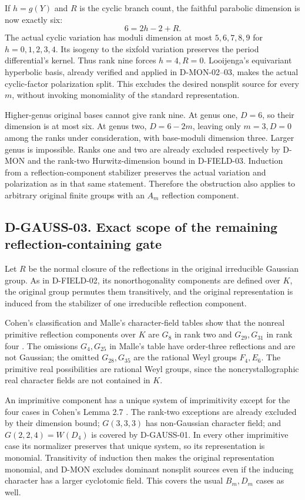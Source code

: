 If \(h=g(Y)\) and \(R\) is the cyclic branch count, the faithful
parabolic dimension is now exactly six:
\[
                              6=2h-2+R.
\]
The actual cyclic variation has moduli dimension at most
\(5,6,7,8,9\) for \(h=0,1,2,3,4\). Its isogeny to the
sixfold variation preserves the period differential's kernel. Thus
rank nine forces \(h=4,R=0\). Looijenga's equivariant hyperbolic
basis, already verified and applied in D-MON-02--03, makes the actual
cyclic-factor polarization split. This excludes the desired nonsplit
source for every \(m\), without invoking monomiality of the standard
representation.

Higher-genus original bases cannot give rank nine. At genus one,
\(D=6\), so their dimension is at most six. At genus two,
\(D=6-2m\), leaving only \(m=3,D=0\) among the ranks under
consideration, with base-moduli dimension three. Larger genus is
impossible. Ranks one and two are already excluded respectively by
D-MON and the rank-two Hurwitz-dimension bound in D-FIELD-03.
Induction from a reflection-component stabilizer preserves the actual
variation and polarization as in that same statement. Therefore the
obstruction also applies to arbitrary original finite groups with an
\(A_m\) reflection component.

\subsection*{D-GAUSS-03. Exact scope of the remaining reflection-containing gate}

Let \(R\) be the normal closure of the reflections in the original
irreducible Gaussian group. As in D-FIELD-02, its nonorthogonality
components are defined over \(K\), the original group permutes them
transitively, and the original representation is induced from the
stabilizer of one irreducible reflection component.

Cohen's classification and Malle's character-field tables show that
the nonreal primitive reflection components over \(K\) are \(G_8\)
in rank two and \(G_{29},G_{31}\) in rank four
\cite[\S3.6 and Theorem 5.12]{FIELD:Cohen}
\cite[Tables 8.1--8.2, pp.~674--675]{FIELD:Malle}.
The omissions \(G_4,G_{25}\) in Malle's table have order-three
reflections and are not Gaussian; the omitted \(G_{28},G_{35}\)
are the rational Weyl groups \(F_4,E_6\).
The primitive real possibilities are rational Weyl groups, since the
noncrystallographic real character fields are not contained in \(K\).

An imprimitive component has a unique system of imprimitivity except
for the four cases in Cohen's Lemma 2.7
\cite[pp.~389--390]{FIELD:Cohen}. The rank-two exceptions are already
excluded by their dimension bound; \(G(3,3,3)\) has non-Gaussian
character field; and \(G(2,2,4)=W(D_4)\) is covered by D-GAUSS-01.
In every other imprimitive case its normalizer preserves that unique
system, so its representation is monomial. Transitivity of induction
then makes the original representation monomial, and D-MON excludes
dominant nonsplit sources even if the inducing character has a larger
cyclotomic field. This covers the usual \(B_m,D_m\) cases as well.

